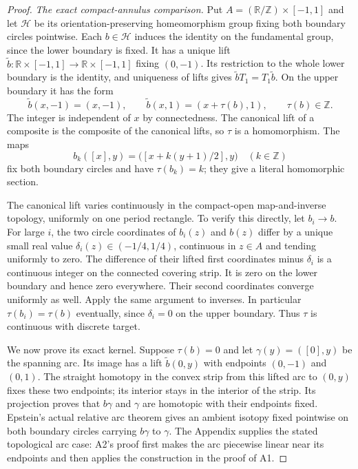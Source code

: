 \begin{proof}
\emph{The exact compact-annulus comparison.}
Put $A=(\mathbb R/\mathbb Z)\times[-1,1]$
and let $\mathscr H$ be its
orientation-preserving homeomorphism
group fixing both boundary circles
pointwise. Each $b\in\mathscr H$
induces the identity on the fundamental
group, since the lower boundary is
fixed. It has a unique lift
$\widetilde b:\mathbb R\times[-1,1]
\to\mathbb R\times[-1,1]$ fixing
$(0,-1)$. Its restriction to the
whole lower boundary is the identity,
and uniqueness of lifts gives
$\widetilde bT_1=T_1\widetilde b$.
On the upper boundary it has the form
\[
 \widetilde b(x,-1)=(x,-1),\qquad
 \widetilde b(x,1)=(x+\tau(b),1),\qquad
                         \tau(b)\in\mathbb Z.                   \tag{C.87.1}
\]
The integer is independent of $x$
by connectedness. The canonical lift
of a composite is the composite of
the canonical lifts, so $\tau$ is
a homomorphism. The maps
\[
     b_k([x],y)=\bigl([x+k(y+1)/2],y\bigr)
                         \quad(k\in\mathbb Z)                  \tag{C.87.2}
\]
fix both boundary circles and have
$\tau(b_k)=k$; they give a literal
homomorphic section.

The canonical lift varies continuously
in the compact-open map-and-inverse
topology, uniformly on one period
rectangle. To verify this directly,
let $b_i\to b$. For large $i$, the
two circle coordinates of $b_i(z)$
and $b(z)$ differ by a unique small
real value $\delta_i(z)\in(-1/4,1/4)$,
continuous in $z\in A$ and tending
uniformly to zero. The difference
of their lifted first coordinates
minus $\delta_i$ is a continuous
integer on the connected covering
strip. It is zero on the lower
boundary and hence zero everywhere.
Their second coordinates converge
uniformly as well. Apply the same
argument to inverses. In particular
$\tau(b_i)=\tau(b)$ eventually, since
$\delta_i=0$ on the upper boundary.
Thus $\tau$ is continuous with
discrete target.

We now prove its exact kernel.
Suppose $\tau(b)=0$ and let
$\gamma(y)=([0],y)$ be the spanning
arc. Its image has a lift
$\widetilde b(0,y)$ with endpoints
$(0,-1)$ and $(0,1)$.
The straight homotopy in the convex
strip from this lifted arc to
$(0,y)$ fixes these two endpoints;
its interior stays in the interior
of the strip. Its projection proves
that $b\gamma$ and $\gamma$ are
homotopic with their endpoints
fixed. Epstein's actual relative
arc theorem
\cite[Theorem~3.1, pp.~89--90; Appendix~A1--A2 and their proofs, pp.~105--106]{C_Epstein1966}
gives an ambient isotopy fixed
pointwise on both boundary circles
carrying $b\gamma$ to $\gamma$.
The Appendix supplies the stated
topological arc case: A2's proof
first makes the arc piecewise linear
near its endpoints and then applies
the construction in the proof of A1.


\end{proof}
